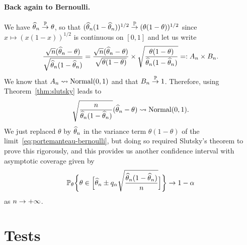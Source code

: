 \paragraph{Back again to Bernoulli.}

We have $\widehat \theta_n \overset{\mathbb P}{\rightarrow} \theta$, so that $(\widehat \theta_n (1 - \widehat \theta_n))^{1/2} \overset{\mathbb P}{\rightarrow} (\theta (1 -  \theta))^{1/2}$ since $x \mapsto (x(1-x))^{1/2}$ is continuous on $[0, 1]$ and let us write
\begin{equation*}
	\frac{\sqrt n (\widehat \theta_n - \theta)}{\sqrt{\widehat \theta_n (1 - \widehat \theta_n)}} 
	= \frac{\sqrt n (\widehat \theta_n - \theta)}{\sqrt{ \theta (1 -  \theta)}} \times 
	\sqrt{\frac{ \theta (1 -  \theta)}{\widehat \theta_n (1 - \widehat \theta_n)}} =: A_n \times B_n.
\end{equation*}
We know that $A_n \leadsto \operatorname{Normal}(0, 1)$ and that $B_n \overset{\mathbb P}{\rightarrow} 1$.
Therefore, using Theorem~\ref{thm:slutsky} leads%
%
to
\begin{equation*}
	\sqrt{\frac{n}{\widehat \theta_n (1 - \widehat \theta_n)}} (\widehat \theta_n - \theta) \leadsto \operatorname{Normal}(0, 1).
\end{equation*}
We just replaced $\theta$ by $\widehat \theta_n$ in the variance term $\theta(1 - \theta)$ of the limit~\eqref{eq:portemanteau-bernoulli}, but doing so required Slutsky's theorem to prove this rigorously, and this provides us another confidence interval with asymptotic coverage given by
\begin{equation*}
	\mathbb P_\theta \bigg\{ \theta \in \Big[ \widehat \theta_n \pm q_\alpha \sqrt{\frac{\widehat \theta_n (1 - \widehat \theta_n)}{n}} \Big] \bigg\} \rightarrow 1 - \alpha
\end{equation*}
as $n \rightarrow +\infty$.%
%


\section{Tests} %
\label{sec:tests}

